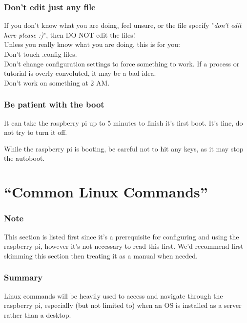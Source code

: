 \documentclass[a4paper, 10pt]{article}
\begin{document}
            \subsubsection{Don't edit just any file}
            If you don't know what you are doing, feel unsure, or the file specify "\textit{don't edit here please :)}", then DO NOT edit the files!\\

            Unless you really know what you are doing, this is for you:\\
            Don't touch .config files.\\
            Don't change configuration settings to force something to work. If a process or tutorial is overly convoluted, it may be a bad idea.\\
            Don't work on something at 2 AM.

            \subsubsection{Be patient with the boot}
            It can take the raspberry pi up to 5 minutes to finish it's first boot. It's fine, do not try to turn it off.

            While the raspberry pi is booting, be careful not to hit any keys, as it may stop the autoboot.

 \pagebreak


\section{``Common Linux Commands''}
		\subsubsection*{Note}
		This section is listed first since it's a prerequisite for           configuring and using the raspberry pi, however it's not             necessary to read this first.
            We'd recommend first skimming this section then treating it as a manual when needed.

            \subsubsection*{Summary}
            Linux commands will be heavily used to access and navigate through the raspberry pi, especially (but not limited to) when an OS is installed as a server rather than a desktop.
	
\end{document}
